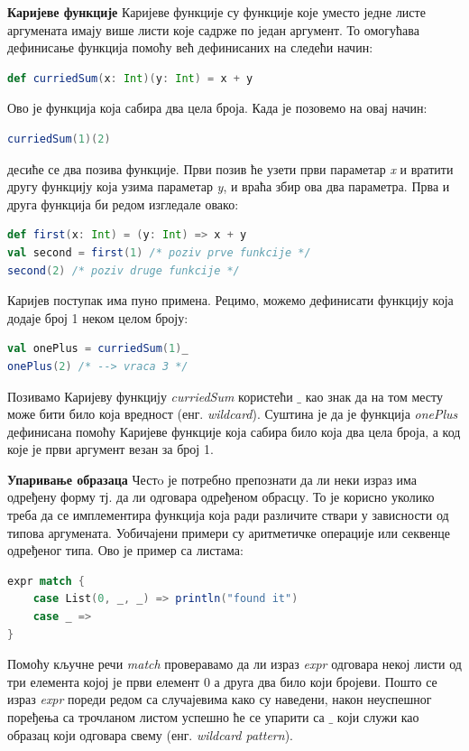 \documentclass[12pt,oneside]{memoir}
\begin{document}
\begin{description}
\item \textbf{Каријеве функције} %
Каријеве функције су функције које уместо једне листе аргумената имају више листи које садрже по један аргумент. То омогућава дефинисање функција помоћу већ дефинисаних на следећи начин:
\begin{lstlisting}[language=Scala]
def curriedSum(x: Int)(y: Int) = x + y
\end{lstlisting}
Ово је функција која сабира два цела броја. Када је позовемо на овај начин:
\begin{lstlisting}[language=Scala]
curriedSum(1)(2)
\end{lstlisting}
десиће се два позива функције. Први позив ће узети први параметар \textit{x} и вратити другу функцију која узима параметар \textit{y}, и враћа збир ова два параметра. Прва и друга функција би редом изгледале овако:
\begin{lstlisting}[language=Scala]
def first(x: Int) = (y: Int) => x + y
val second = first(1) /* poziv prve funkcije */
second(2) /* poziv druge funkcije */
\end{lstlisting}
Каријев поступак има пуно примена. Рецимо, можемо дефинисати функцију која додаје број 1 неком целом броју:
\begin{lstlisting}[language=Scala]
val onePlus = curriedSum(1)_
onePlus(2) /* --> vraca 3 */
\end{lstlisting}
Позивамо Каријеву функцију \textit{curriedSum} користећи \textit{$\_$} као знак да на том месту може бити било која вредност (енг. \textit{wildcard}). Суштина је да је функција \textit{onePlus} дефинисана помоћу Каријеве функције која сабира било која два цела броја, а код које је први аргумент везан за број 1.
\item \textbf{Упаривање образаца}
\label{uparObr}
Честo је потребно препознати да ли неки израз има одређену форму тј. да ли одговара одређеном обрасцу. То је корисно уколико треба да се имплементира функција која ради различите ствари у зависности од типова аргумената. Уобичајени примери су аритметичке операције или секвенце одређеног типа. Ово је пример са листама: 
\begin{lstlisting}[language=Scala]
expr match {
	case List(0, _, _) => println("found it")
	case _ =>
}
\end{lstlisting}
Помоћу кључне речи \textit{match} проверавамо да ли израз \textit{expr} одговара некој листи од три елемента којој је први елемент 0 а друга два било који бројеви. Пошто се израз \textit{expr} пореди редом са случајевима како су наведени, након неуспешног поређења са трочланом листом успешно ће се упарити са \textit{$\_$} који служи као образац који одговара свему (енг. \textit{wildcard pattern}). 


\end{description}
\end{document}

